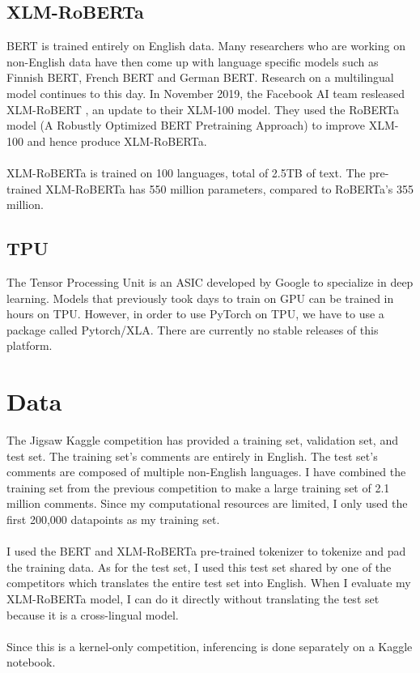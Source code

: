 \documentclass[11pt,a4paper]{article}
\begin{document}
\subsection{XLM-RoBERTa}

BERT is trained entirely on English data. Many researchers who are working on non-English data have then come up with language specific models such as Finnish BERT, French BERT and German BERT. Research on a multilingual model continues to this day. In November 2019, the Facebook AI team resleased XLM-RoBERT \cite{xlm-roberta}, an update to their XLM-100 model. They used the RoBERTa \cite{roberta} model (A Robustly Optimized BERT Pretraining Approach) to improve XLM-100 and hence produce XLM-RoBERTa.\\
\\
XLM-RoBERTa is trained on 100 languages, total of 2.5TB of text. The pre-trained XLM-RoBERTa has 550 million parameters, compared to RoBERTa's 355 million.\\

\subsection{TPU}

The Tensor Processing Unit is an ASIC developed by Google to specialize in deep learning. Models that previously took days to train on GPU can be trained in hours on TPU. However, in order to use PyTorch on TPU, we have to use a package called Pytorch/XLA. There are currently no stable releases of this platform.\\ 

\section{Data}

The Jigsaw Kaggle competition has provided a training set, validation set, and test set. The training set’s comments are entirely in English. The test set’s comments are composed of multiple non-English languages. I have combined the training set from the previous competition to make a large training set of 2.1 million comments. Since my computational resources are limited, I only used the first 200,000 datapoints as my training set. \\
\\
I used the BERT and XLM-RoBERTa pre-trained tokenizer to tokenize and pad the training data. As for the test set, I used this test set shared by one of the competitors \cite{test-en-df} which translates the entire test set into English. When I evaluate my XLM-RoBERTa model, I can do it directly without translating the test set because it is a cross-lingual model.\\ 
\\
Since this is a kernel-only competition, inferencing is done separately on a Kaggle notebook.\\
\end{document}
